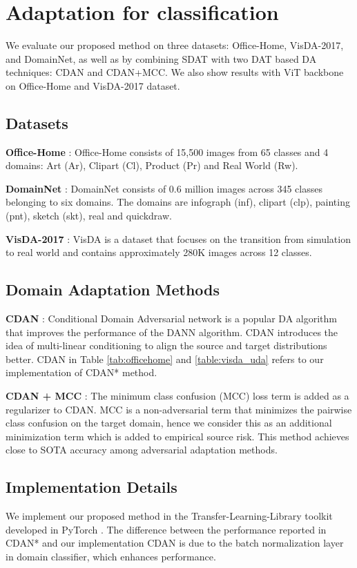 \documentclass[table,dvipsnames]{article}
\theoremstyle{plain}
\theoremstyle{definition}
\theoremstyle{remark}
\begin{document}
\section{Adaptation for classification}


We evaluate our proposed method on three datasets: Office-Home, VisDA-2017, and DomainNet, as well as by combining SDAT with two DAT based DA techniques: CDAN and CDAN+MCC. We also show results with ViT backbone on Office-Home and VisDA-2017 dataset.
\subsection{Datasets}
\textbf{Office-Home} \citep{venkateswara2017Deep}: Office-Home consists of 15,500 images from 65 classes and 4 domains: Art (Ar), Clipart (Cl), Product (Pr) and Real World (Rw).

\textbf{DomainNet }\citep{peng2019moment}: DomainNet consists of 0.6 million images across 345 classes belonging to six domains. The domains are infograph (inf), clipart (clp), painting (pnt), sketch (skt), real and quickdraw.


\textbf{VisDA-2017 }\citep{visda2017}:  VisDA is a dataset that focuses on the transition from simulation to real world and contains approximately 280K images across 12 classes. 




\subsection{Domain Adaptation Methods}
\textbf{CDAN }\citep{long2018conditional}: Conditional Domain Adversarial network is a popular DA algorithm that improves the performance of the DANN algorithm. CDAN introduces the idea of multi-linear conditioning to align the source and target distributions better. CDAN in Table \ref{tab:officehome} and \ref{table:visda_uda} refers to our implementation of CDAN* \cite{long2018conditional} method. 

\textbf{CDAN + MCC }\citep{jin2020minimum}: The minimum class confusion (MCC) loss term is added as a regularizer to CDAN. MCC is a non-adversarial term that minimizes the pairwise class confusion on the target domain, hence we consider this as an additional minimization term which is added to empirical source risk. This method achieves close to SOTA accuracy among adversarial adaptation methods. 
\subsection{Implementation Details} \label{imple}
We implement our proposed method in the Transfer-Learning-Library \citep{dalib} toolkit developed in PyTorch \citep{NEURIPS2019_9015}. The difference between the performance reported in CDAN* and our implementation CDAN is due to the batch normalization layer in domain classifier, which enhances performance. 
\end{document}
